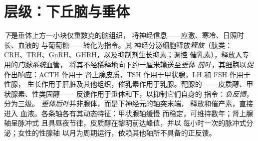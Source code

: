 \section{层级：下丘脑与垂体}

\begin{definition}[各轴]\label{def:b3:endocrinology:axes}
\emph{下}是垂体上方一小块仅重数克的脑组织，
将神经信息——应激、寒冷、日照时长、血液的
与葡萄糖——转化为指令。其
神经分泌细胞释放\emph{释放}（肽类：
CRH、TRH、GnRH、GHRH，以及抑制剂生长抑素；调控
催乳素），释放入专用的\emph{门脉系统}血管，
将其不经稀释地向下约一厘米输送至\emph{垂体
前叶}，其细胞以\emph{促}作出响应：ACTH 作用于
肾上腺皮质，TSH 作用于甲状腺，LH 和 FSH 作用于性腺，
生长作用于肝脏及其他组织，催乳素作用于乳腺。靶腺的
——皮质醇、甲状腺素、性类固醇——
反馈作用于垂体和下，以抑制它们自身的
指令：\emph{负反馈}，分为三级。
\emph{垂体后叶}并非腺体，而是下神经元的轴突末端，
释放和催产素，直接进入
血液。各条轴各有其动态特征：甲状腺轴缓慢
而稳定，可维持数年；肾上腺轴呈脉冲式
且具昼夜节律，皮质醇在黎明前达峰值，并以
每小时一次的脉冲式分泌；女性的性腺轴
以月为周期运行，依赖其他轴所不具备的正反馈。
\end{definition}

